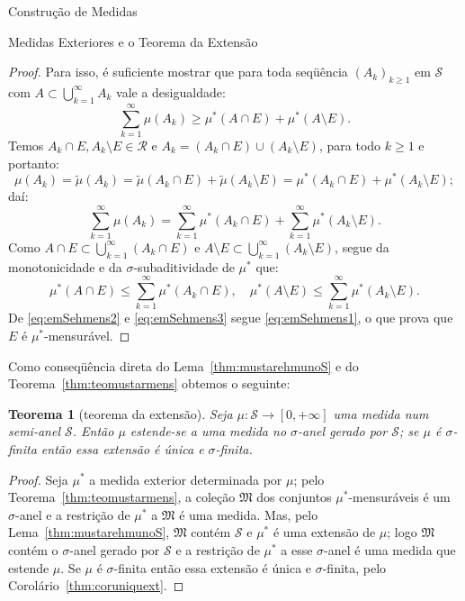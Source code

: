 \documentclass[oneside,final,11pt]{amsbook}
\theoremstyle{remark}\newtheorem{exercise}{Exercício}[chapter]
\theoremstyle{remark}\newtheorem{*exercise}[exercise]{\hbox to 0pt{\hskip 0pt minus 1fil*}Exercício}
\theoremstyle{definition}\newtheorem{exdefin}{Definição}[chapter]
\theoremstyle{plain}\newtheorem{teo}{Teorema}[section]
\theoremstyle{plain}\newtheorem{lem}[teo]{Lema}
\theoremstyle{plain}\newtheorem{prop}[teo]{Proposição}
\theoremstyle{plain}\newtheorem{cor}[teo]{Corolário}
\theoremstyle{definition}\newtheorem{defin}[teo]{Definição}
\theoremstyle{remark}\newtheorem{rem}[teo]{Observação}
\theoremstyle{definition}\newtheorem{notation}[teo]{Notação}
\theoremstyle{definition}\newtheorem{convention}[teo]{Convenção}
\theoremstyle{definition}\newtheorem{example}[teo]{Exemplo}
\numberwithin{section}{chapter}
\numberwithin{equation}{section}
\begin{document}
\begin{chapter}{Construção de Medidas}
\begin{section}{Medidas Exteriores e o Teorema da Extensão}
\begin{proof}
Para isso, é suficiente mostrar que para toda seqüência $(A_k)_{k\ge1}$ em $\mathcal S$
com $A\subset\bigcup_{k=1}^\infty A_k$ vale a desigualdade:
\begin{equation}\label{eq:emSehmens1}
\sum_{k=1}^\infty\mu(A_k)\ge\mu^*(A\cap E)+\mu^*(A\setminus E).
\end{equation}
Temos $A_k\cap E,A_k\setminus E\in\mathcal R$ e $A_k=(A_k\cap E)\cup(A_k\setminus E)$,
para todo $k\ge1$ e portanto:
\[\mu(A_k)=\tilde\mu(A_k)=\tilde\mu(A_k\cap E)+\tilde\mu(A_k\setminus E)
=\mu^*(A_k\cap E)+\mu^*(A_k\setminus E);\]
daí:
\begin{equation}\label{eq:emSehmens2}
\sum_{k=1}^\infty\mu(A_k)=\sum_{k=1}^\infty\mu^*(A_k\cap E)+\sum_{k=1}^\infty
\mu^*(A_k\setminus E).
\end{equation}
Como $A\cap E\subset\bigcup_{k=1}^\infty(A_k\cap E)$ e
$A\setminus E\subset\bigcup_{k=1}^\infty(A_k\setminus E)$, segue da monotonicidade
e da $\sigma$-subaditividade de $\mu^*$ que:
\begin{equation}\label{eq:emSehmens3}
\mu^*(A\cap E)\le\sum_{k=1}^\infty\mu^*(A_k\cap E),\quad
\mu^*(A\setminus E)\le\sum_{k=1}^\infty\mu^*(A_k\setminus E).
\end{equation}
De \eqref{eq:emSehmens2} e \eqref{eq:emSehmens3} segue \eqref{eq:emSehmens1}, o que prova
que $E$ é $\mu^*$-mensurável.
\end{proof}

Como conseqüência direta do Lema~\ref{thm:mustarehmunoS} e do Teorema~\ref{thm:teomustarmens}
obtemos o seguinte:
\begin{teo}[teorema da extensão]%
\label{thm:teoextensao}
Seja $\mu:\mathcal S\to[0,+\infty]$ uma medida num semi-anel $\mathcal S$. Então
$\mu$ estende-se a uma medida no $\sigma$-anel gerado por $\mathcal S$; se $\mu$ é
$\sigma$-finita então essa extensão é única e $\sigma$-finita.
\end{teo}
\begin{proof}
Seja $\mu^*$ a medida exterior determinada por $\mu$;
pelo Teorema~\ref{thm:teomustarmens}, a coleção $\mathfrak M$ dos conjuntos $\mu^*$-mensuráveis
é um $\sigma$-anel e a restrição de $\mu^*$ a $\mathfrak M$ é uma medida. Mas, pelo Lema~\ref{thm:mustarehmunoS},
$\mathfrak M$ contém $\mathcal S$ e $\mu^*$ é uma extensão de $\mu$; logo $\mathfrak M$
contém o $\sigma$-anel gerado por $\mathcal S$ e a restrição de $\mu^*$ a esse $\sigma$-anel
é uma medida que estende $\mu$. Se $\mu$ é $\sigma$-finita então essa extensão é única e $\sigma$-finita,
pelo Corolário~\ref{thm:coruniquext}.
\end{proof}


\end{section}
\end{chapter}
\end{document}
